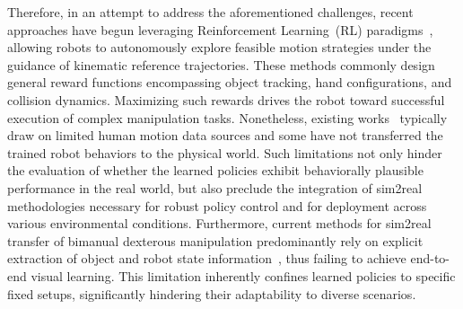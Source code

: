 Therefore, in an attempt to address the aforementioned challenges, recent approaches have begun leveraging Reinforcement Learning~(RL) paradigms~\cite{chenobject,li2025maniptrans,mandi2025dexmachina}, allowing robots to autonomously explore feasible motion strategies under the guidance of kinematic reference trajectories. These methods commonly design general reward functions encompassing object tracking, hand configurations, and collision dynamics. Maximizing such rewards drives the robot toward successful execution of complex manipulation tasks. Nonetheless, existing works~\cite{mandi2025dexmachina,li2025maniptrans,chenobject} typically draw on limited human motion data sources and some have not transferred the trained robot behaviors to the physical world. Such limitations not only hinder the evaluation of whether the learned policies exhibit behaviorally plausible performance in the real world, but also preclude the integration of sim2real methodologies necessary for robust policy control and for deployment across various environmental conditions. Furthermore, current methods for sim2real transfer of bimanual dexterous manipulation predominantly rely on explicit extraction of object and robot state information~\cite{lin2024learning,chenobject,chen2023sequential,lin2024twisting}, thus failing to achieve end-to-end visual learning. This limitation inherently confines learned policies to specific fixed setups, significantly hindering their adaptability to diverse scenarios.

